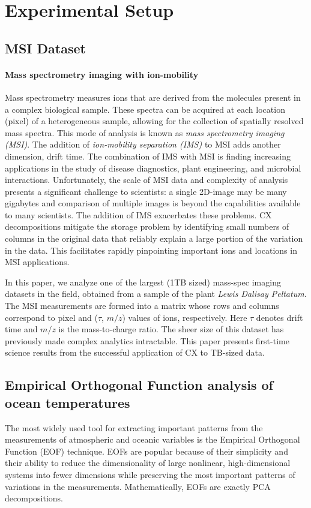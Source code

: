 \section{Experimental Setup}
\label{sec:setup}

\subsection{MSI Dataset}
\paragraph{Mass spectrometry imaging with ion-mobility}
Mass spectrometry measures ions that are derived from the molecules present in a complex biological sample.
These spectra can be acquired at each location (pixel) of a heterogeneous sample, allowing for the collection of spatially
resolved mass spectra.
This mode of analysis is known as \textit{mass spectrometry imaging (MSI)}.
The addition of \textit{ion-mobility separation (IMS)} to MSI adds another
dimension, drift time.  The combination of IMS with MSI is finding increasing
applications in the study of disease diagnostics, plant engineering, and
microbial interactions. Unfortunately, the scale of MSI data and complexity of
analysis presents a significant challenge to scientists: a single 2D-image may
be many gigabytes and comparison of multiple images is beyond the capabilities
available to many scientists. The addition of IMS exacerbates these problems.
CX decompositions mitigate the storage problem by identifying small numbers of
columns in the original data that reliably explain a large portion of the
variation in the data.  This facilitates rapidly pinpointing important ions and
locations in MSI applications.

In this paper, we analyze one of the largest (1TB sized) mass-spec imaging
datasets in the field, obtained from a sample of the plant {\it Lewis Dalisay
  Peltatum}. The MSI measurements are formed into a matrix whose rows and
columns correspond to pixel and ($\tau$, $m/z$) values of ions, respectively.
Here $\tau$ denotes drift time and $m/z$ is the mass-to-charge ratio. The sheer
size of this dataset has previously made complex analytics intractable. This
paper presents first-time science results from the successful application of CX
to TB-sized data.

\subsection{Empirical Orthogonal Function analysis of ocean temperatures}
The most widely used tool for extracting important patterns from the
measurements of atmospheric and oceanic variables is the Empirical Orthogonal
Function (EOF) technique. EOFs are popular because of their simplicity and
their ability to reduce the dimensionality of large nonlinear, high-dimensional
systems into fewer dimensions while preserving the most important patterns of
variations in the measurements. Mathematically, EOFs are exactly PCA decompositions.

